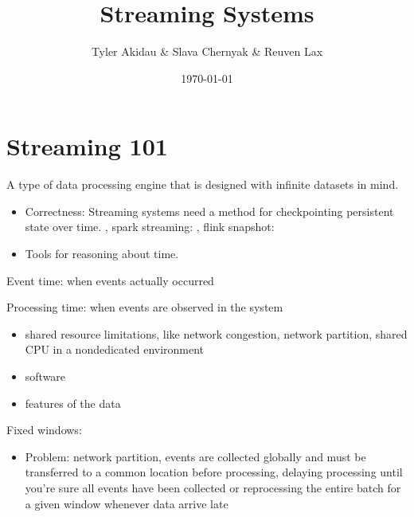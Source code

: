 \documentclass[11pt]{article}
\author{Tyler Akidau \& Slava Chernyak \& Reuven Lax}
\date{\today}
\title{Streaming Systems}
\begin{document}
\maketitle
\tableofcontents


\section{Streaming 101}
\label{sec:org35a4e3f}
A type of data processing engine that is designed with infinite datasets in mind.

\begin{itemize}
\item Correctness: Streaming systems need a method for checkpointing persistent state over time.
\cite{akidau2013millwheel}, spark streaming: \cite{zaharia2013discretized}, flink snapshot:
\cite{carbone2015lightweight}
\item Tools for reasoning about time.
\end{itemize}

Event time: when events actually occurred

Processing time: when events are observed in the system
\begin{itemize}
\item shared resource limitations, like network congestion, network partition, shared CPU in a
nondedicated environment
\item software
\item features of the data
\end{itemize}

Fixed windows:
\begin{itemize}
\item Problem: network partition, events are collected globally and must be transferred to a common
location before processing, delaying processing until you’re sure all events have been
collected or reprocessing the entire batch for a given window whenever data arrive late
\end{itemize}
\end{document}
